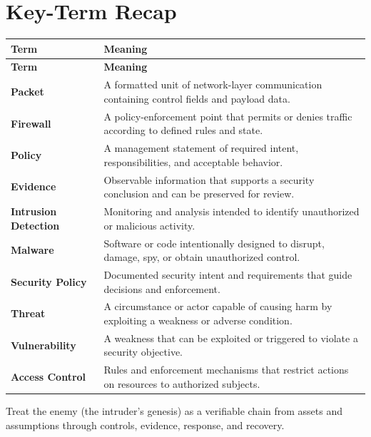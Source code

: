 \documentclass[11pt]{article}
\begin{document}
\section*{Key-Term Recap}
\begin{longtable}{>{\RaggedRight\arraybackslash}p{}>{\RaggedRight\arraybackslash}p{}}
\toprule\rowcolor{Navy}\color{white}\textbf{Term} & \color{white}\textbf{Meaning}\\\midrule
\endfirsthead
\toprule\rowcolor{Navy}\color{white}\textbf{Term} & \color{white}\textbf{Meaning}\\\midrule
\endhead
\textbf{Packet} & A formatted unit of network-layer communication containing control fields and payload data. \\\midrule
\textbf{Firewall} & A policy-enforcement point that permits or denies traffic according to defined rules and state. \\\midrule
\textbf{Policy} & A management statement of required intent, responsibilities, and acceptable behavior. \\\midrule
\textbf{Evidence} & Observable information that supports a security conclusion and can be preserved for review. \\\midrule
\textbf{Intrusion Detection} & Monitoring and analysis intended to identify unauthorized or malicious activity. \\\midrule
\textbf{Malware} & Software or code intentionally designed to disrupt, damage, spy, or obtain unauthorized control. \\\midrule
\textbf{Security Policy} & Documented security intent and requirements that guide decisions and enforcement. \\\midrule
\textbf{Threat} & A circumstance or actor capable of causing harm by exploiting a weakness or adverse condition. \\\midrule
\textbf{Vulnerability} & A weakness that can be exploited or triggered to violate a security objective. \\\midrule
\textbf{Access Control} & Rules and enforcement mechanisms that restrict actions on resources to authorized subjects. \\\midrule
\bottomrule
\end{longtable}
\begin{takeawaybox}
Treat the enemy (the intruder's genesis) as a verifiable chain from assets and assumptions through controls, evidence, response, and recovery.
\end{takeawaybox}
\end{document}
